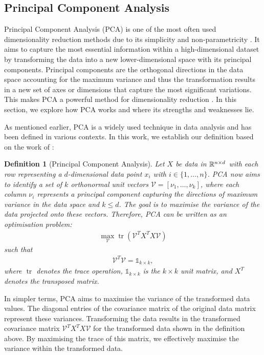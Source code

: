 \documentclass[pdftex,12pt,a4paper]{report}
\newtheorem{definition}{Definition}[section]
\begin{document}
\subsection{Principal Component Analysis} \label{PCA}

Principal Component Analysis (PCA) is one of the most often used dimensionality reduction methods due to its simplicity and non-parametricity \cite{PCA-joliffe}.
It aims to capture the most essential information within a high-dimensional dataset by transforming the data into a new lower-dimensional space with its principal components.
Principal components are the orthogonal directions in the data space accounting for the maximum variance and thus the transformation results in a new set of axes or dimensions that capture the most significant variations.
This makes PCA a powerful method for dimensionality reduction \cite{PCA-tutorial} \cite{PCA-joliffe}.
In this section, we explore how PCA works and where its strengths and weaknesses lie.

As mentioned earlier, PCA is a widely used technique in data analysis and has been defined in various contexts.
In this work, we establish our definition based on the work of \cite{PCA-optimisation}:

\begin{definition}[Principal Component Analysis] 
    Let $X$ be data in $\mathbb{R} ^{n \times d}$ with each row representing a $d$-dimensional data point $x_i$ with $i \in \{1, \dots, n\}$.
    PCA now aims to identify a set of $k$ orthonormal unit vectors $\mathcal{V} = [\nu_1, \dots, \nu_k]$, where each column $\nu_i$ represents a principal component capturing the directions of maximum variance in the data space and $k \leq d$.
    The goal is to maximise the variance of the data projected onto these vectors.
    Therefore, PCA can be written as an optimisation problem:
    \begin{align*}
        \max_{\mathcal{V}} \operatorname{tr}(\mathcal{V} ^T X^T X \mathcal{V}) 
    \end{align*}
    such that
    \begin{align*}
        \mathcal{V}^T \mathcal{V} = \mathbb{1}_{k \times k},
    \end{align*}
    where $ \operatorname{tr}$ denotes the trace operation, $\mathbb{1}_{k \times k}$ is the $k \times k $ unit matrix, and $X^T$ denotes the transposed matrix.
\end{definition}

In simpler terms, PCA aims to maximise the variance of the transformed data values.
The diagonal entries of the covariance matrix of the original data matrix represent these variances.
Transforming the data results in the transformed covariance matrix $\mathcal{V} ^T X^T X \mathcal{V}$ for the transformed data shown in the definition above.
By maximising the trace of this matrix, we effectively maximise the variance within the transformed data.
\end{document}

